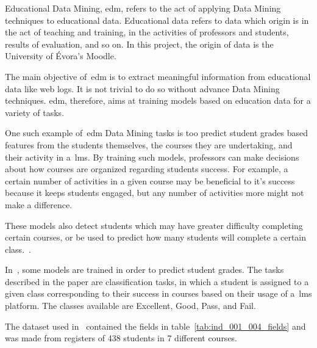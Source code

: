 
Educational Data Mining, \gls{edm}, refers to the act of applying Data Mining
techniques to educational data. Educational data refers to data which origin is
in the act of teaching and training, in the activities of professors and
students, results of evaluation, and so on. In this project, the origin of data
is the University of Évora's Moodle.

The main objective of~\gls{edm} is to extract meaningful information from
educational data like web logs. It is not trivial to do so without advance Data
Mining techniques. \gls{edm}, therefore, aims at training models based on
education data for a variety of tasks.

One such example of~\gls{edm} Data Mining tasks is too predict student grades
based features from the students themselves, the courses they are undertaking,
and their activity in a~\gls{lms}. By training such models, professors can make
decisions about how courses are organized regarding students success. For
example, a certain number of activities in a given course may be beneficial to
it's success because it keeps students engaged, but any number of activities
more might not make a difference.~\cite{ind_001, ind_002, ind_005}

These models also detect students which may have greater difficulty completing
certain courses, or be used to predict how many students will complete a
certain class.~\cite{ind_007, ind_008}.

In~\cite{ind_001}, some models are trained in order to predict student grades.
The tasks described in the paper are classification tasks, in which a student
is assigned to a given class corresponding to their success in courses based on
their usage of a~\gls{lms} platform. The classes available are Excellent, Good,
Pass, and Fail.

The dataset used in~\cite{ind_001} contained the fields in
table~\ref{tab:ind_001_004_fields} and was made from registers of 438 students
in 7 different courses.

